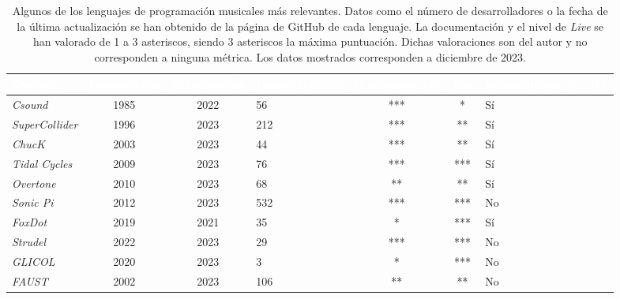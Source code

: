 \begin{table}[htbp]
  \centering
  \caption[Algunos de los lenguajes de programación musicales más relevantes]{Algunos de los lenguajes de programación musicales más relevantes. Datos como el número de desarrolladores o la fecha de la última actualización se han obtenido de la página de GitHub de cada lenguaje. La documentación y el nivel de \emph{Live} se han valorado de 1 a 3 asteriscos, siendo 3 asteriscos la máxima puntuación. Dichas valoraciones son del autor y no corresponden a ninguna métrica. Los datos mostrados corresponden a diciembre de 2023.}
  \label{tab:lenguajes_comparativa}
  \fontsize{9.5pt}{11pt}\selectfont
  \begingroup
  \begin{tabularx}{\linewidth}{|l|c|c|l|c|c|l|}
      \toprule
      \rowcolor{azul_unir} %
      \textcolor{white}{\textbf{Lenguaje}} & \textcolor{white}{\textbf{Lanzamiento}} & \textcolor{white}{\textbf{Actualización}} & \textcolor{white}{\textbf{Desarrolladores}} & \textcolor{white}{\textbf{Documentación}} & \textcolor{white}{\textbf{\emph{Live}}} & \textcolor{white}{\textbf{Independiente de IDE}} \\
      \midrule
      \emph{Csound} & 1985 & 2022 & 56 & *** & * & Sí \\
      \emph{SuperCollider} & 1996 & 2023 & 212 & *** & ** & Sí \\
      \emph{ChucK} & 2003 & 2023 & 44 & *** & ** & Sí \\
      \emph{Tidal Cycles} & 2009 & 2023 & 76 & *** & *** & Sí \\
      \emph{Overtone} & 2010 & 2023 & 68 & ** & ** & Sí \\
      \emph{Sonic Pi} & 2012 & 2023 & 532 & *** & *** & No \\
      \emph{FoxDot} & 2019 & 2021 & 35 & * & *** & Sí \\
      \emph{Strudel} & 2022 & 2023 & 29 & *** & *** & No \\
      \emph{GLICOL} & 2020 & 2023 & 3 & * & *** & No\\ %
      \emph{FAUST} & 2002 & 2023 & 106 & ** & ** & No\\ %
      \bottomrule
  \end{tabularx}
  \endgroup
  \source{\propio}
\end{table}